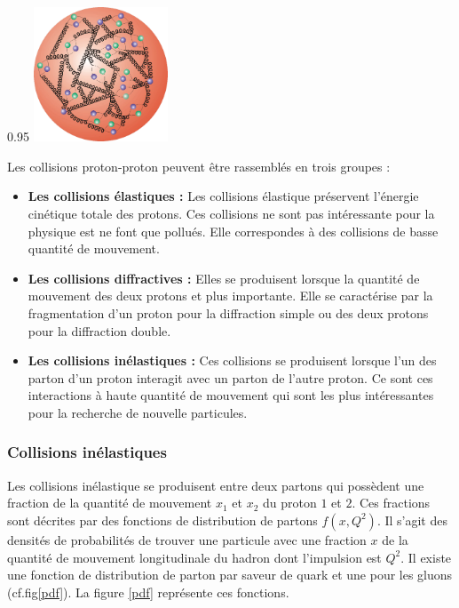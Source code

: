 \begin{minipagewithmarginpars}[h]{0.95\textwidth}
\centering
\includegraphics[width=0.3\textwidth]{SM/quarks3.png}
\label{proton}	
\end{minipagewithmarginpars}

Les collisions proton-proton peuvent être rassemblés en trois groupes :
\begin{itemize}[label=$\bullet$]
	\item \textbf{Les collisions élastiques : } Les collisions élastique préservent l'énergie cinétique totale des protons. Ces collisions ne sont pas intéressante pour la physique est ne font que pollués. Elle correspondes à des collisions de basse quantité de mouvement.
	\item\textbf{Les collisions diffractives : } Elles se produisent lorsque la quantité de mouvement des deux protons et plus importante. Elle se caractérise par la fragmentation d'un proton pour la diffraction simple ou des deux protons pour la diffraction double.
	\item \textbf{Les collisions inélastiques : } Ces collisions se produisent lorsque l'un des parton d'un proton interagit avec un parton de l'autre proton. Ce sont ces interactions à haute quantité de mouvement qui sont les plus intéressantes pour la recherche de nouvelle particules.
\end{itemize}

\subsubsection{Collisions inélastiques}
Les collisions inélastique se produisent entre deux partons qui possèdent une fraction de la quantité de mouvement $x_{1}$ et $x_{2}$ du proton $1$ et $2$. Ces fractions sont décrites par des fonctions de distribution de partons $f(x,Q^{2})$. Il s'agit des densités de probabilités de trouver une particule avec une fraction $x$ de la quantité de mouvement longitudinale du hadron dont l'impulsion est $Q^{2}$. Il existe une fonction de distribution de parton par saveur de quark et une pour les gluons (cf.fig\ref{pdf}). La figure \ref{pdf} représente ces fonctions.

